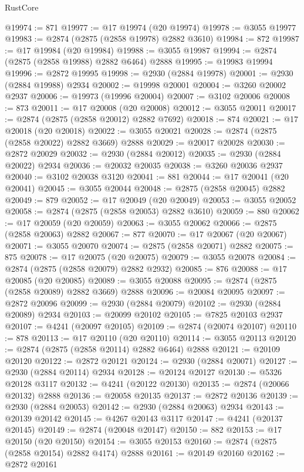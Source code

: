 \begin{lexlean}{RustCore}
\begin{coremodule}
@19974 := 871
@19977 := @17 @19974 (@20 @19974)
@19978 := @3055 @19977
@19983 := @2874 (@2875 (@2858 @19978) @2882 @3610)
@19984 := 872
@19987 := @17 @19984 (@20 @19984)
@19988 := @3055 @19987
@19994 := @2874 (@2875 (@2858 @19988) @2882 @6464) @2888
@19995 := @19983 @19994
@19996 := @2872 @19995
@19998 := @2930 (@2884 @19978)
@20001 := @2930 (@2884 @19988) @2934
@20002 := @19998 @20001
@20004 := @3260 @20002 @2937
@20006 := @19973 (@19996 @20004)
@20007 := @3102 @20006
@20008 := 873
@20011 := @17 @20008 (@20 @20008)
@20012 := @3055 @20011
@20017 := @2874 (@2875 (@2858 @20012) @2882 @7692)
@20018 := 874
@20021 := @17 @20018 (@20 @20018)
@20022 := @3055 @20021
@20028 := @2874 (@2875 (@2858 @20022) @2882 @3669) @2888
@20029 := @20017 @20028
@20030 := @2872 @20029
@20032 := @2930 (@2884 @20012)
@20035 := @2930 (@2884 @20022) @2934
@20036 := @20032 @20035
@20038 := @3260 @20036 @2937
@20040 := @3102 @20038 @3120
@20041 := 881
@20044 := @17 @20041 (@20 @20041)
@20045 := @3055 @20044
@20048 := @2875 (@2858 @20045) @2882
@20049 := 879
@20052 := @17 @20049 (@20 @20049)
@20053 := @3055 @20052
@20058 := @2874 (@2875 (@2858 @20053) @2882 @3610)
@20059 := 880
@20062 := @17 @20059 (@20 @20059)
@20063 := @3055 @20062
@20066 := @2875 (@2858 @20063) @2882
@20067 := 877
@20070 := @17 @20067 (@20 @20067)
@20071 := @3055 @20070
@20074 := @2875 (@2858 @20071) @2882
@20075 := 875
@20078 := @17 @20075 (@20 @20075)
@20079 := @3055 @20078
@20084 := @2874 (@2875 (@2858 @20079) @2882 @2932)
@20085 := 876
@20088 := @17 @20085 (@20 @20085)
@20089 := @3055 @20088
@20095 := @2874 (@2875 (@2858 @20089) @2882 @3669) @2888
@20096 := @20084 @20095
@20097 := @2872 @20096
@20099 := @2930 (@2884 @20079)
@20102 := @2930 (@2884 @20089) @2934
@20103 := @20099 @20102
@20105 := @7825 @20103 @2937
@20107 := @4241 (@20097 @20105)
@20109 := @2874 (@20074 @20107)
@20110 := 878
@20113 := @17 @20110 (@20 @20110)
@20114 := @3055 @20113
@20120 := @2874 (@2875 (@2858 @20114) @2882 @6464) @2888
@20121 := @20109 @20120
@20122 := @2872 @20121
@20124 := @2930 (@2884 @20071)
@20127 := @2930 (@2884 @20114) @2934
@20128 := @20124 @20127
@20130 := @5326 @20128 @3117
@20132 := @4241 (@20122 @20130)
@20135 := @2874 (@20066 @20132) @2888
@20136 := @20058 @20135
@20137 := @2872 @20136
@20139 := @2930 (@2884 @20053)
@20142 := @2930 (@2884 @20063) @2934
@20143 := @20139 @20142
@20145 := @4267 @20143 @3117
@20147 := @4241 (@20137 @20145)
@20149 := @2874 (@20048 @20147)
@20150 := 882
@20153 := @17 @20150 (@20 @20150)
@20154 := @3055 @20153
@20160 := @2874 (@2875 (@2858 @20154) @2882 @4174) @2888
@20161 := @20149 @20160
@20162 := @2872 @20161

\end{coremodule}
\end{lexlean}
